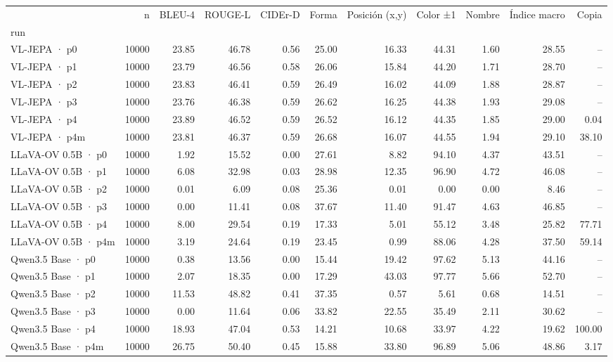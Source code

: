 \begin{tabular}{lrrrrrrrrrr}
\toprule
 & n & BLEU-4 & ROUGE-L & CIDEr-D & Forma & Posición (x,y) & Color ±1 & Nombre & Índice macro & Copia \\
run &  &  &  &  &  &  &  &  &  &  \\
\midrule
VL-JEPA · p0 & 10000 & 23.85 & 46.78 & 0.56 & 25.00 & 16.33 & 44.31 & 1.60 & 28.55 & -- \\
VL-JEPA · p1 & 10000 & 23.79 & 46.56 & 0.58 & 26.06 & 15.84 & 44.20 & 1.71 & 28.70 & -- \\
VL-JEPA · p2 & 10000 & 23.83 & 46.41 & 0.59 & 26.49 & 16.02 & 44.09 & 1.88 & 28.87 & -- \\
VL-JEPA · p3 & 10000 & 23.76 & 46.38 & 0.59 & 26.62 & 16.25 & 44.38 & 1.93 & 29.08 & -- \\
VL-JEPA · p4 & 10000 & 23.89 & 46.52 & 0.59 & 26.52 & 16.12 & 44.35 & 1.85 & 29.00 & 0.04 \\
VL-JEPA · p4m & 10000 & 23.81 & 46.37 & 0.59 & 26.68 & 16.07 & 44.55 & 1.94 & 29.10 & 38.10 \\
LLaVA-OV 0.5B · p0 & 10000 & 1.92 & 15.52 & 0.00 & 27.61 & 8.82 & 94.10 & 4.37 & 43.51 & -- \\
LLaVA-OV 0.5B · p1 & 10000 & 6.08 & 32.98 & 0.03 & 28.98 & 12.35 & 96.90 & 4.72 & 46.08 & -- \\
LLaVA-OV 0.5B · p2 & 10000 & 0.01 & 6.09 & 0.08 & 25.36 & 0.01 & 0.00 & 0.00 & 8.46 & -- \\
LLaVA-OV 0.5B · p3 & 10000 & 0.00 & 11.41 & 0.08 & 37.67 & 11.40 & 91.47 & 4.63 & 46.85 & -- \\
LLaVA-OV 0.5B · p4 & 10000 & 8.00 & 29.54 & 0.19 & 17.33 & 5.01 & 55.12 & 3.48 & 25.82 & 77.71 \\
LLaVA-OV 0.5B · p4m & 10000 & 3.19 & 24.64 & 0.19 & 23.45 & 0.99 & 88.06 & 4.28 & 37.50 & 59.14 \\
Qwen3.5 Base · p0 & 10000 & 0.38 & 13.56 & 0.00 & 15.44 & 19.42 & 97.62 & 5.13 & 44.16 & -- \\
Qwen3.5 Base · p1 & 10000 & 2.07 & 18.35 & 0.00 & 17.29 & 43.03 & 97.77 & 5.66 & 52.70 & -- \\
Qwen3.5 Base · p2 & 10000 & 11.53 & 48.82 & 0.41 & 37.35 & 0.57 & 5.61 & 0.68 & 14.51 & -- \\
Qwen3.5 Base · p3 & 10000 & 0.00 & 11.64 & 0.06 & 33.82 & 22.55 & 35.49 & 2.11 & 30.62 & -- \\
Qwen3.5 Base · p4 & 10000 & 18.93 & 47.04 & 0.53 & 14.21 & 10.68 & 33.97 & 4.22 & 19.62 & 100.00 \\
Qwen3.5 Base · p4m & 10000 & 26.75 & 50.40 & 0.45 & 15.88 & 33.80 & 96.89 & 5.06 & 48.86 & 3.17 \\

\end{tabular}
